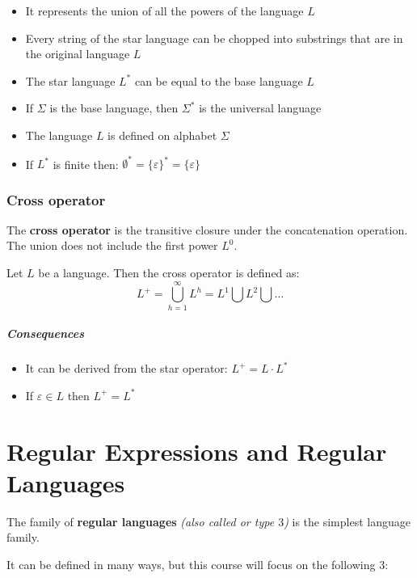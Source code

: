 \documentclass[english]{article}
\begin{document}
\begin{itemize}
  \item It represents the union of all the powers of the language \(L\)
  \item Every string of the star language can be chopped into substrings that are in the original language \(L\)
  \item The star language \(L^\ast\) can be equal to the base language \(L\)
  \item If \(\Sigma\) is the base language, then \(\Sigma^\ast\) is the universal language
  \item The language \(L\) is defined on alphabet \(\Sigma\)
  \item If \(L^\ast\) is finite then: \(\emptyset^\ast = \{\varepsilon\}^\ast = \{\varepsilon\}\)
\end{itemize}

\subsubsection{Cross operator}

The \textbf{cross operator} is the transitive closure under the concatenation operation.
The union does not include the first power \(L^0\).

\begin{definition}
  Let \(L\) be a language.
  Then the cross operator is defined as:
  \[ L^+ = \bigcup_{h=1}^{\infty} L^h = L^1 \bigcup L^2 \bigcup \ldots \]
\end{definition}

\subparagraph*{Consequences}

\begin{itemize}
  \item It can be derived from the star operator: \(L^+ = L \cdot L^\ast\)
  \item If \(\varepsilon \in L\) then \(L^+ = L^\ast\)
\end{itemize}

\clearpage

\section{Regular Expressions and Regular Languages}

The family of \textbf{regular languages} \textit{(also called \REG or type \(3\))} is the simplest language family.

It can be defined in many ways, but this course will focus on the following \(3\):
\end{document}
